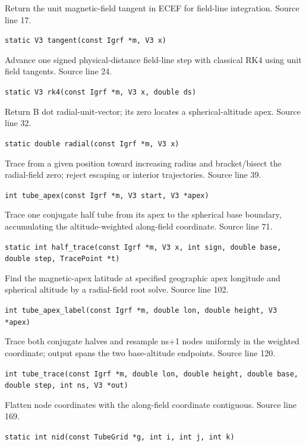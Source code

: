\begin{description}[style=nextline,leftmargin=0pt,labelindent=0pt,labelwidth=0pt,labelsep=0pt]
\item[\texttt{tangent}] Return the unit magnetic-field tangent in ECEF for field-line integration. Source line 17.\par
{\small\nolinkurl{static V3 tangent(const Igrf *m, V3 x)}}
\item[\texttt{rk4}] Advance one signed physical-distance field-line step with classical RK4 using unit field tangents. Source line 24.\par
{\small\nolinkurl{static V3 rk4(const Igrf *m, V3 x, double ds)}}
\item[\texttt{radial}] Return B dot radial-unit-vector; its zero locates a spherical-altitude apex. Source line 32.\par
{\small\nolinkurl{static double radial(const Igrf *m, V3 x)}}
\item[\texttt{tube\_apex}] Trace from a given position toward increasing radius and bracket/bisect the radial-field zero; reject escaping or interior trajectories. Source line 39.\par
{\small\nolinkurl{int tube_apex(const Igrf *m, V3 start, V3 *apex)}}
\item[\texttt{half\_trace}] Trace one conjugate half tube from its apex to the spherical base boundary, accumulating the altitude-weighted along-field coordinate. Source line 71.\par
{\small\nolinkurl{static int half_trace(const Igrf *m, V3 x, int sign, double base, double step, TracePoint *t)}}
\item[\texttt{tube\_apex\_label}] Find the magnetic-apex latitude at specified geographic apex longitude and spherical altitude by a radial-field root solve. Source line 102.\par
{\small\nolinkurl{int tube_apex_label(const Igrf *m, double lon, double height, V3 *apex)}}
\item[\texttt{tube\_trace}] Trace both conjugate halves and resample ns+1 nodes uniformly in the weighted coordinate; output spans the two base-altitude endpoints. Source line 120.\par
{\small\nolinkurl{int tube_trace(const Igrf *m, double lon, double height, double base, double step, int ns, V3 *out)}}
\item[\texttt{nid}] Flatten node coordinates with the along-field coordinate contiguous. Source line 169.\par
{\small\nolinkurl{static int nid(const TubeGrid *g, int i, int j, int k)}}

\end{description}
